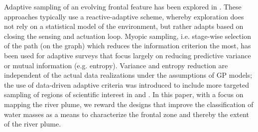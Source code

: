 \documentclass[aoas]{imsart}
\begin{document}





Adaptive sampling of an evolving frontal feature has been explored in
\cite{fronts11,Zhang2012,Pinto2018,costa19}. These approaches
typically use a reactive-adaptive scheme, whereby exploration does not
rely on a statistical model of the environment, but rather adapts
based on closing the sensing and actuation loop. Myopic sampling, i.e. stage-wise selection of
the path (on the graph) which reduces the information criterion the
most, has been used for adaptive surveys
\citep{singh2009efficient,Binney2013} that focus largely on reducing
predictive variance or mutual information (e.g. entropy). Variance and
entropy reduction are independent of the actual data realizations
under the assumptions of GP models; the use of data-driven adaptive
criteria was introduced to include more targeted sampling of regions
of scientific interest in \cite{Low2009} and \cite{fossuminformation}.
In this paper, with a focus on mapping the river plume, we reward the
designs that improve the classification of water masses as a means to
characterize the frontal zone and thereby the extent of the river plume.
\end{document}
